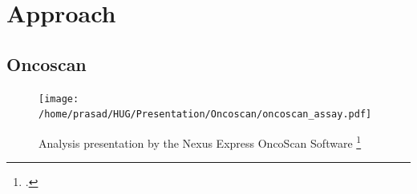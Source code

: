 \documentclass{beamer}
\begin{document}
\section{Approach}
%				
				
				\subsection{Oncoscan}
				
				\begin{frame}
				 \begin{figure}
				\centering
				\texttt{[image: /home/prasad/HUG/Presentation/Oncoscan/oncoscan\_assay.pdf]}
				\caption{Analysis presentation by the Nexus Express OncoScan Software \footcite {Jung2017,}}
				\label{fig:stream}
				\end{figure}
				\end{frame}	
				
\end{document}
